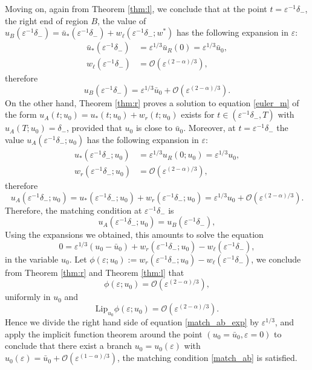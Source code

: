 \documentclass[letterpaper,11pt]{article}
\newcommand{\rmO}{\mathcal{O}}
\newcommand{\eps}{\varepsilon}
\numberwithin{equation}{section}
\theoremstyle{plain}
\begin{document}
Moving on, again from Theorem \ref{thm:l}, we conclude that at the point $t=\eps^{-1}\delta_-$, the right end of region $B$, the value of $u_B(\eps^{-1}\delta_-) = \bar{u}_*(\eps^{-1}\delta_-)  + w_\ell(\eps^{-1}\delta_-; w^*)$ has the following expansion in $\eps$:
\begin{align*}
\bar{u}_*(\eps^{-1}\delta_-) &= \eps^{1/3}\bar{u}_R(0) = \eps^{1/3}\bar{u}_0, \\
w_\ell(\eps^{-1}\delta_-) &=  \rmO(\eps^{(2-\alpha)/3}), 
\end{align*}
therefore
\[
u_B(\eps^{-1}\delta_-) = \eps^{1/3} \bar{u}_0+\rmO(\eps^{(2-\alpha)/3}).
\]
On the other hand, Theorem \ref{thm:r} proves a solution to equation \eqref{euler_m} of the form $u_A(t;u_0) = u_*(t; u_0) + w_r(t; u_0)$ exists for $ t \in (\eps^{-1}\delta_-, T)$ with $u_A(T;u_0) = \delta_-$, provided that $u_0$ is close to $\bar{u}_0$. Moreover, at $t=\eps^{-1}\delta_-$ the value $u_A(\eps^{-1}\delta_-; u_0)$ has the following expansion in $\eps$:
\begin{align*}
u_*(\eps^{-1}\delta_-; u_0) &= \eps^{1/3}u_R(0;u_0) =  \eps^{1/3}u_0,\\
w_r(\eps^{-1}\delta_-; u_0) &= \rmO(\eps^{(2-\alpha)/3}),
\end{align*}
therefore
\[
u_A(\eps^{-1}\delta_-; u_0 ) = u_*(\eps^{-1}\delta_-; u_0)+ w_r(\eps^{-1}\delta_-; u_0)=\eps^{1/3}u_0 + \rmO(\eps^{(2-\alpha)/3}).
\]
Therefore, the matching condition at $\eps^{-1}\delta_-$ is
\begin{equation}\label{match_ab}
u_A(\eps^{-1}\delta_-; u_0) = u_B(\eps^{-1}\delta_-),
\end{equation}
Using the expansions we obtained, this amounts to solve the equation
\begin{equation}\label{match_ab_exp}
0= \eps^{1/3}(u_0 - \bar{u}_0) + w_r(\eps^{-1}\delta_-; u_0)-w_\ell(\eps^{-1}\delta_-),
\end{equation}
in the variable $u_0$.
Let $\phi(\eps; u_0) :=  w_r(\eps^{-1}\delta_-; u_0)-w_\ell(\eps^{-1}\delta_-)$, we conclude from Theorem \ref{thm:r} and Theorem \ref{thm:l} that
\[
\phi(\eps; u_0) = \rmO(\eps^{(2-\alpha)/3}), 
\]
uniformly in $u_0$ and 
\[
\text{Lip}_{u_0} \phi(\eps; u_0) = \rmO(\eps^{(2-\alpha)/3}).
\]
Hence we divide the right hand side of equation \eqref{match_ab_exp} by $\eps^{1/3}$, and apply the implicit function theorem around the point $(u_0=\bar{u}_0, \eps=0)$ to conclude that there exist a branch $u_0 = u_0(\eps)$ with $u_0(\eps)  = \bar{u}_0 + \rmO(\eps^{(1-\alpha)/3})$, the matching condition \eqref{match_ab} is satisfied. 
\end{document}
